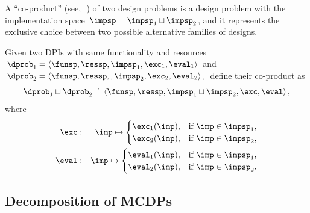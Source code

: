 A ``co-product'' (see,~\eg\,\cite[Section 2.4]{spivak14category})
of two design problems is a design problem with the implementation
space~$\impsp=\impsp_{1}\sqcup\impsp_{2}$, and it represents the
exclusive choice between two possible alternative families of designs.
\begin{definition}[Co-product]
\label{def:parallel-1}Given two DPIs with same functionality and
resources $\dprob_{1}=\left\langle \funsp,\ressp,\impsp_{1},\exc_{1},\eval_{1}\right\rangle $
and $\dprob_{2}=\left\langle \funsp,\ressp,,\impsp_{2},\exc_{2},\eval_{2}\right\rangle ,$
define their co-product as
\[
\dprob_{1}\sqcup\dprob_{2}\doteq\left\langle \funsp,\ressp,\impsp_{1}\sqcup\impsp_{2},\exc,\eval\right\rangle ,
\]
where
\begin{eqnarray}
\exc & : & \imp\mapsto\begin{cases}
\exc_{1}(\imp), & \text{if }\imp\in\impsp_{1},\\
\exc_{2}(\imp), & \text{if }\imp\in\impsp_{2},
\end{cases}\label{eq:dppar-exec-1}\\
\eval & : & \imp\mapsto\begin{cases}
\eval_{1}(\imp), & \text{if }\imp\in\impsp_{1},\\
\eval_{2}(\imp), & \text{if }\imp\in\impsp_{2}.
\end{cases}\nonumber 
\end{eqnarray}

\end{definition}

\subsection{Decomposition of MCDPs\label{sec:Decomposition}}

